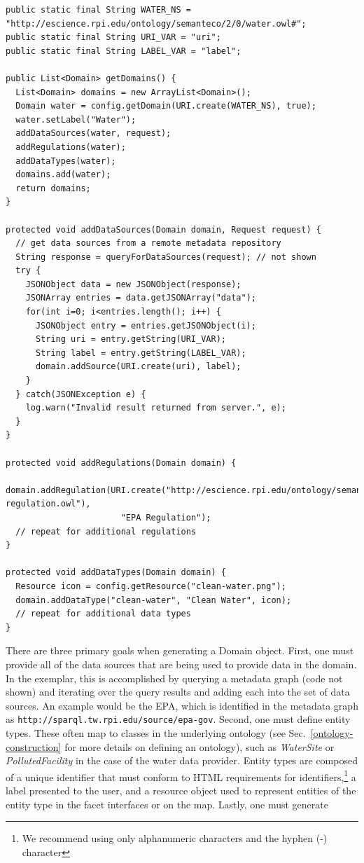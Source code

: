 \documentclass[letterpaper]{report}
\begin{document}
\begin{lstlisting}[float,style=Java,caption=Code exemplar for ProvidesDomain,label=listing:ProvidesDomain]
public static final String WATER_NS = "http://escience.rpi.edu/ontology/semanteco/2/0/water.owl#";
public static final String URI_VAR = "uri";
public static final String LABEL_VAR = "label";

public List<Domain> getDomains() {
  List<Domain> domains = new ArrayList<Domain>();
  Domain water = config.getDomain(URI.create(WATER_NS), true);
  water.setLabel("Water");
  addDataSources(water, request);
  addRegulations(water);
  addDataTypes(water);
  domains.add(water);
  return domains;
}

protected void addDataSources(Domain domain, Request request) {
  // get data sources from a remote metadata repository
  String response = queryForDataSources(request); // not shown
  try {
    JSONObject data = new JSONObject(response);
    JSONArray entries = data.getJSONArray("data");
    for(int i=0; i<entries.length(); i++) {
      JSONObject entry = entries.getJSONObject(i);
      String uri = entry.getString(URI_VAR);
      String label = entry.getString(LABEL_VAR);
      domain.addSource(URI.create(uri), label);
    }
  } catch(JSONException e) {
    log.warn("Invalid result returned from server.", e);
  }
}

protected void addRegulations(Domain domain) {
  domain.addRegulation(URI.create("http://escience.rpi.edu/ontology/semanteco/2/0/EPA-regulation.owl"),
                       "EPA Regulation");
  // repeat for additional regulations
}

protected void addDataTypes(Domain domain) {
  Resource icon = config.getResource("clean-water.png");
  domain.addDataType("clean-water", "Clean Water", icon);
  // repeat for additional data types
}
\end{lstlisting}

There are three primary goals when generating a Domain object. First, one must provide all of the data sources that are being used to provide data in the domain. In the exemplar, this is accomplished by querying a metadata graph (code not shown) and iterating over the query results and adding each into the set of data sources. An example would be the EPA, which is identified in the metadata graph as \texttt{http://sparql.tw.rpi.edu/source/epa-gov}. Second, one must define entity types. These often map to classes in the underlying ontology (see Sec.~\ref{ontology-construction} for more details on defining an ontology), such as \textit{WaterSite} or \textit{PollutedFacility} in the case of the water data provider. Entity types are composed of a unique identifier that must conform to HTML requirements for identifiers,\footnote{We recommend using only alphanumeric characters and the hyphen (-) character} a label presented to the user, and a resource object used to represent entities of the entity type in the facet interfaces or on the map. Lastly, one must generate 
\end{document}

